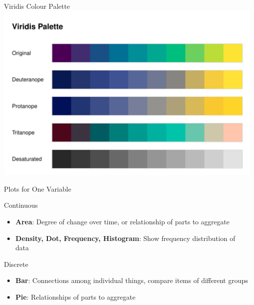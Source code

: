 \documentclass[ignorenonframetext,xcolor=x11names]{beamer}
\begin{document}
\begin{frame}{Viridis Colour Palette}
  \includegraphics[width=\textwidth]{viridis.plot.pdf}
\end{frame}


\begin{frame}{Plots for One Variable}
\begin{block}{Continuous}
\begin{itemize}
  \item {\bf Area}: Degree of change over time, or relationship of parts to aggregate
  \item {\bf Density, Dot, Frequency, Histogram}: Show frequency distribution of data
\end{itemize}
\end{block}

\begin{block}{Discrete}
\begin{itemize}
  \item {\bf Bar}: Connections among individual things, compare items of different groups
  \item {\bf Pie}: Relationships of parts to aggregate
\end{itemize}
\end{block}
\end{frame}
\end{document}
